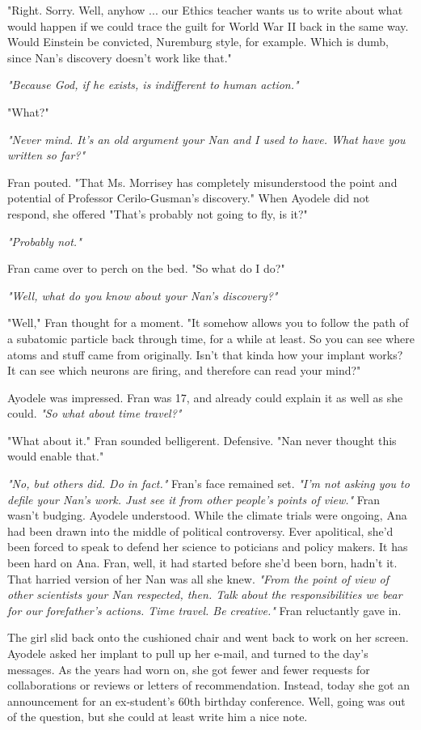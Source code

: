 \documentclass{article}
\begin{document}
"Right. Sorry. Well, anyhow ... our Ethics teacher wants us to write about what would happen if we could trace the guilt for World War II back in the same way. Would Einstein be convicted, Nuremburg style, for example. Which is dumb, since Nan's discovery doesn't work like that."

\emph{"Because God, if he exists, is indifferent to human action."}

"What?"

\emph{"Never mind. It’s an old argument your Nan and I used to have. What have you written so far?"}

Fran pouted. "That Ms. Morrisey has completely misunderstood the point and potential of Professor Cerilo-Gusman's discovery." When Ayodele did not respond, she offered "That's probably not going to fly, is it?"

\emph{"Probably not."}

Fran came over to perch on the bed. "So what do I do?"

\emph{"Well, what do you know about your Nan's discovery?"}

"Well," Fran thought for a moment. "It somehow allows you to follow the path of a subatomic particle back through time, for a while at least. So you can see where atoms and stuff came from originally. Isn't that kinda how your implant works? It can see which neurons are firing, and therefore can read your mind?"

Ayodele was impressed. Fran was 17, and already could explain it as well as she could. \emph{"So what about time travel?"}

"What about it." Fran sounded belligerent. Defensive. "Nan never thought this would enable that."

\emph{"No, but others did. Do in fact."} Fran's face remained set. \emph{"I'm not asking you to defile your Nan's work. Just see it from other people's points of view."} Fran wasn't budging. Ayodele understood. While the climate trials were ongoing, Ana had been drawn into the middle of political controversy. Ever apolitical, she'd been forced to speak to defend her science to poticians and policy makers. It has been hard on Ana. Fran, well, it had started before she'd been born, hadn't it. That harried version of her Nan was all she knew. \emph{"From the point of view of other scientists your Nan respected, then. Talk about the responsibilities we bear for our forefather's actions. Time travel. Be creative."} Fran reluctantly gave in. 

The girl slid back onto the cushioned chair and went back to work on her screen. Ayodele asked her implant to pull up her e-mail, and turned to the day's messages. As the years had worn on, she got fewer and fewer requests for collaborations or reviews or letters of recommendation. Instead, today she got an announcement for an ex-student's 60th birthday conference. Well, going was out of the question, but she could at least write him a nice note.
\end{document}
